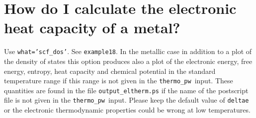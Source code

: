 \documentclass[12pt,a4paper]{article}
\def\thermo{\texttt{thermo\_pw}}
\begin{document}
\section{\color{coral} How do I calculate the electronic heat capacity
of a metal?}
Use \texttt{what='scf\_dos'}. See \texttt{example18}. In the metallic
case in addition to a plot of the density of states this option produces
also a plot of the electronic energy, free energy, entropy, heat capacity
and chemical potential in the standard temperature range if this range is
not given in the \thermo\ input. These quantities are found in the file
\texttt{output\_eltherm.ps} if the name of the postscript
file is not given in the \thermo\ input.
Please keep the default value of \texttt{deltae} or the electronic
thermodynamic properties could be wrong at low temperatures.
\end{document}
